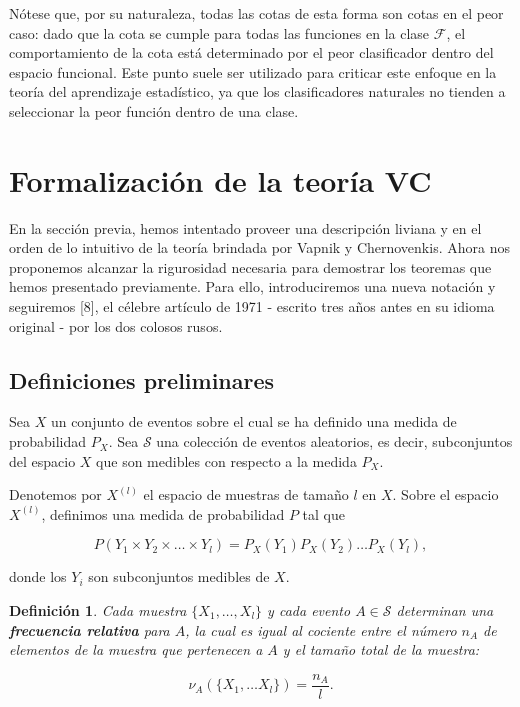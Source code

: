 \documentclass{article}
\newtheorem{dfn}{Definición}[subsection]
\begin{document}
Nótese que, por su naturaleza, todas las cotas de esta forma son cotas en el peor caso: dado que 
la cota se cumple para todas las funciones en la clase \(\mathcal{F}\), el comportamiento de la cota 
está determinado por el peor clasificador dentro del espacio funcional. Este punto suele ser 
utilizado para criticar este enfoque en la teoría del aprendizaje estadístico, ya que los clasificadores 
naturales no tienden a seleccionar la peor función dentro de una clase.\newline


\section{Formalización de la teoría VC}

En la sección previa, hemos intentado proveer una descripción liviana y en el orden de lo intuitivo de la teoría brindada por 
Vapnik y Chernovenkis. Ahora nos proponemos alcanzar la rigurosidad necesaria para demostrar los teoremas que hemos presentado 
previamente. Para ello, introduciremos una nueva notación y seguiremos [8], el célebre artículo de 1971 - escrito tres años antes en su 
idioma original - por los dos colosos rusos.\newline

\subsection{Definiciones preliminares}

Sea \( X \) un conjunto de eventos sobre el cual se ha definido una medida de probabilidad \( P_X \). Sea \( \mathcal{S} \) una colección de eventos 
aleatorios, es decir, subconjuntos del espacio \( X \) que son medibles con respecto 
a la medida \( P_X \). \newline

Denotemos por \( X^{(l)} \) el espacio de muestras de tamaño \( l \) en \( X \). 
Sobre el espacio \( X^{(l)} \), definimos una medida de probabilidad \( P \) tal que

\[
P(Y_1\times Y_2 \times\dots\times Y_l) = P_X(Y_1) P_X(Y_2) \dots P_X(Y_l),
\]

donde los \( Y_i \) son subconjuntos medibles de \( X \).\newline

\begin{dfn}
Cada muestra \( \{X_1, \dots, X_l\} \) y cada evento \( A \in \mathcal{S} \) determinan 
una \textbf{frecuencia relativa} para \( A \), la cual es igual al cociente entre 
el número \( n_A \) de elementos de la muestra que pertenecen a \( A \) y el tamaño 
total de la muestra:

\[
\nu_A(\{X_1,\dots X_l\}) = \frac{n_A}{l}.
\]

\end{dfn}
\end{document}
